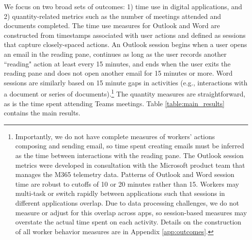 \documentclass{article}
\begin{document}
We focus on two broad sets of outcomes: 1) time use in digital applications, and 2) quantity-related metrics such as the number of meetings attended and documents completed. The time use measures for Outlook and Word are constructed from timestamps associated with user actions and defined as sessions that capture closely-spaced actions. An Outlook session begins when a user opens an email in the reading pane, continues as long as the user records another ``reading" action at least every 15 minutes, and ends when the user exits the reading pane and does not open another email for 15 minutes or more. Word sessions are similarly based on 15 minute gaps in activities (e.g., interactions with a document or series of documents).\footnote{Importantly, we do not have complete measures of workers' actions composing and sending email, so time spent creating emails must be inferred as the time between interactions with the reading pane. The Outlook session metrics were developed in consultation with the Microsoft product team that manages the M365 telemetry data. Patterns of Outlook and Word session time are robust to cutoffs of 10 or 20 minutes rather than 15. Workers may multi-task or switch rapidly between applications such that sessions in different applications overlap. Due to data processing challenges, we do not measure or adjust for this overlap across apps, so session-based measures may overstate the actual time spent on each activity. Details on the construction of all worker behavior measures are in Appendix \ref{app:outcomes}.} The quantity measures are straightforward, as is the time spent attending Teams meetings. Table \ref{table:main_results} contains the main results.
\end{document}
